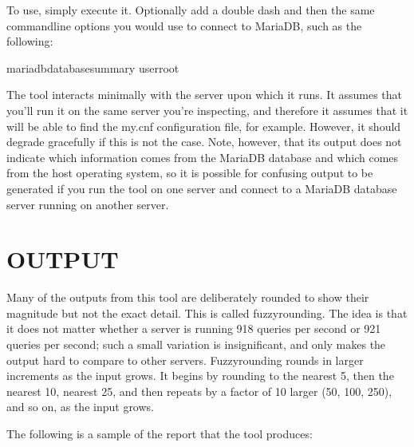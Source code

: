 \documentclass[letterpaper,10pt,english]{sphinxmanual}
\begin{document}
\sphinxAtStartPar
To use, simply execute it.  Optionally add a double dash and then the same
command\sphinxhyphen{}line options you would use to connect to MariaDB, such as the following:

\begin{sphinxVerbatim}[commandchars=\\\{\}]
mariadb\PYGZhy{}database\PYGZhy{}summary \PYGZhy{}\PYGZhy{}userroot
\end{sphinxVerbatim}

\sphinxAtStartPar
The tool interacts minimally with the server upon which it runs.  It assumes
that you’ll run it on the same server you’re inspecting, and therefore it
assumes that it will be able to find the my.cnf configuration file, for example.
However, it should degrade gracefully if this is not the case.  Note, however,
that its output does not indicate which information comes from the MariaDB
database and which comes from the host operating system, so it is possible for
confusing output to be generated if you run the tool on one server and connect
to a MariaDB database server running on another server.


\section{OUTPUT}
\label{\detokenize{mariadb-database-summary:output}}
\sphinxAtStartPar
Many of the outputs from this tool are deliberately rounded to show their
magnitude but not the exact detail.  This is called fuzzy\sphinxhyphen{}rounding. The idea
is that it does not matter whether a server is running 918 queries per second
or 921 queries per second; such a small variation is insignificant, and only
makes the output hard to compare to other servers.  Fuzzy\sphinxhyphen{}rounding rounds in
larger increments as the input grows.  It begins by rounding to the nearest 5,
then the nearest 10, nearest 25, and then repeats by a factor of 10 larger
(50, 100, 250), and so on, as the input grows.

\sphinxAtStartPar
The following is a sample of the report that the tool produces:
\end{document}
